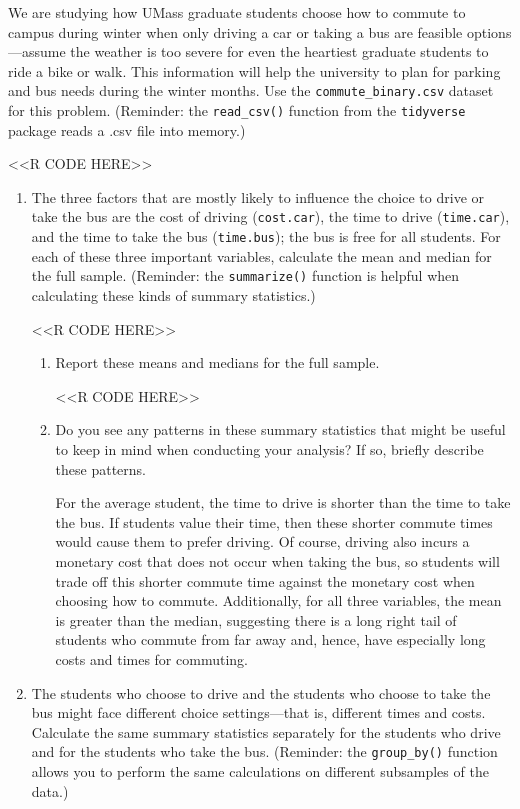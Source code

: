 \documentclass[11pt,letterpaper]{article}
\begin{document}
We are studying how UMass graduate students choose how to commute to campus during winter when only driving a car or taking a bus are feasible options---assume the weather is too severe for even the heartiest graduate students to ride a bike or walk. This information will help the university to plan for parking and bus needs during the winter months. Use the \texttt{commute\_binary.csv} dataset for this problem. (Reminder: the \texttt{read\_csv()} function from the \texttt{tidyverse} package reads a .csv file into memory.)

<<R CODE HERE>>

\begin{enumerate}[label=\alph*., leftmargin=*]
	\item The three factors that are mostly likely to influence the choice to drive or take the bus are the cost of driving (\texttt{cost.car}), the time to drive (\texttt{time.car}), and the time to take the bus (\texttt{time.bus}); the bus is free for all students. For each of these three important variables, calculate the mean and median for the full sample. (Reminder: the \texttt{summarize()} function is helpful when calculating these kinds of summary statistics.)

	<<R CODE HERE>>

	\begin{enumerate}[label=\roman*.]
		\item Report these means and medians for the full sample.

		<<R CODE HERE>>

		\item Do you see any patterns in these summary statistics that might be useful to keep in mind when conducting your analysis? If so, briefly describe these patterns.

		For the average student, the time to drive is shorter than the time to take the bus. If students value their time, then these shorter commute times would cause them to prefer driving. Of course, driving also incurs a monetary cost that does not occur when taking the bus, so students will trade off this shorter commute time against the monetary cost when choosing how to commute. Additionally, for all three variables, the mean is greater than the median, suggesting there is a long right tail of students who commute from far away and, hence, have especially long costs and times for commuting.
	\end{enumerate}

	\item The students who choose to drive and the students who choose to take the bus might face different choice settings---that is, different times and costs. Calculate the same summary statistics separately for the students who drive and for the students who take the bus. (Reminder: the \texttt{group\_by()} function allows you to perform the same calculations on different subsamples of the data.)


\end{enumerate}
\end{document}
